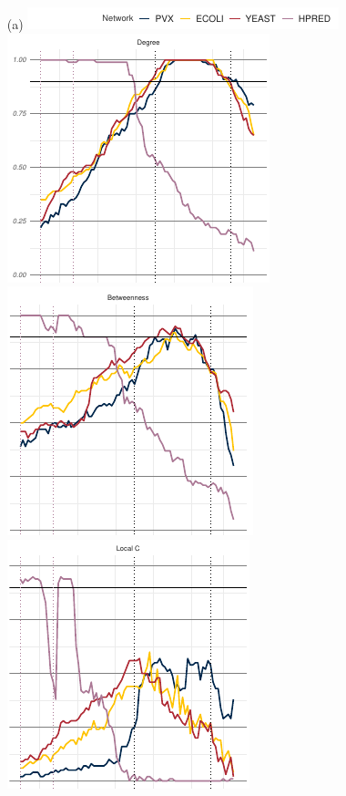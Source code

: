 \begin{figure}
    \begin{enumerate}
        \item[(a)] \includegraphics[scale=1.05]{plot_relaxed_similarity_papertop.pdf}\\
        \includegraphics[scale=1.05,trim={0 0.8mm 0 0},clip]{plot_relaxed_similarity_paper_degree.pdf}\hspace*{0.2mm}\includegraphics[scale=1.05,trim={0 0.3mm 0 0},clip]{plot_relaxed_similarity_paper_betweenness.pdf}\hspace*{-0.45mm}\includegraphics[scale=1.05,trim={0 0.8mm 0 0},clip]{plot_relaxed_similarity_paper_localc.pdf}\\

\end{enumerate}
\end{figure}
